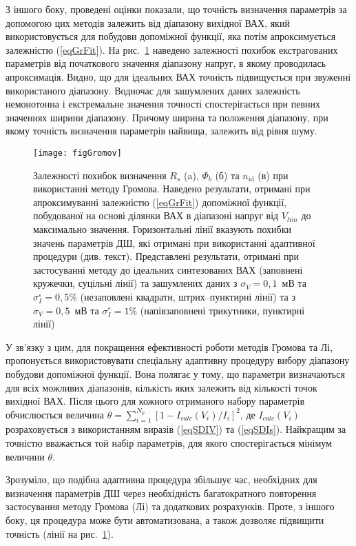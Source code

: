 З іншого боку, проведені оцінки показали, що точність визначення параметрів за допомогою цих методів залежить від діапазону вихідної ВАХ, який використовується для побудови допоміжної функції, яка потім апроксимується залежністю (\ref{eqGrFit}).
На рис.~\ref{figGromov} наведено залежності похибок екстрагованих параметрів від початкового значення діапазону напруг, в якому проводилась апроксимація.
Видно, що для ідеальних ВАХ точність підвищується при звуженні використаного діапазону.
Водночас для зашумлених даних залежність немонотонна і екстремальне значення точності спостерігається при певних значеннях ширини діапазону.
Причому ширина та положення діапазону, при якому точність визначення параметрів найвища, залежить від рівня шуму.



\begin{figure}
\center
\texttt{[image: figGromov]}%
\caption{\label{figGromov}
Залежності похибок визначення $R_s$ (a), $\Phi_b$ (б) та $n_\mathrm{id}$ (в) при використанні методу Громова.
Наведено результати, отримані при апроксимуванні залежністю (\ref{eqGrFit}) допоміжної функції, побудованої
на основі ділянки ВАХ в діапазоні напруг від $V_{lim}$ до максимально значення.
Горизонтальні лінії вказують похибки значень параметрів ДШ, які отримані при використанні адаптивної процедури (див. текст).
Представлені результати, отримані при застосуванні методу до ідеальних синтезованих ВАХ (заповнені кружечки, суцільні лінії) та зашумлених даних
з $\sigma_V=0,1$~мВ та $\sigma_I^\varepsilon=0,5\%$ (незаповлені квадрати, штрих--пунктирні лінії) та з $\sigma_V=0,5$~мВ та $\sigma_I^\varepsilon=1\%$
(напівзаповнені трикутники, пунктирні лінії)
}
\end{figure}

У зв'язку з цим, для покращення ефективності роботи методів Громова та Лі, пропонується використовувати спеціальну адаптивну процедуру вибору діапазону побудови допоміжної функції.
Вона полягає у тому, що параметри визначаються для всіх можливих діапазонів, кількість яких залежить від кількості точок вихідної ВАХ.
Після цього для кожного отриманого набору параметрів обчислюється величина $\theta=\sum_{i=1}^{N_p}[1-I_{calc}(V_i)/I_i]^2$,
де $I_{calc}(V_i)$ розраховується з використанням виразів (\ref{eqSDIV}) та (\ref{eqSDIs}).
Найкращим за точністю вважається той набір параметрів, для якого спостерігається мінімум величини $\theta$.

Зрозуміло, що подібна адаптивна процедура збільшує час, необхідних для визначення параметрів ДШ через необхідність багатократного повторення застосування методу Громова (Лі) та додаткових розрахунків.
Проте, з іншого боку, ця процедура може бути автоматизована, а також дозволяє підвищити точність (лінії на рис.~\ref{figGromov}).

